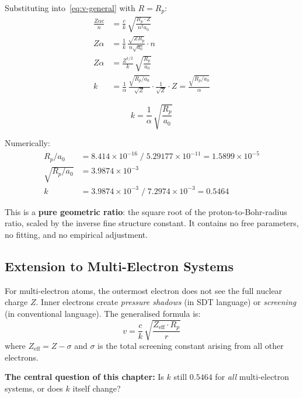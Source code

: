 Substituting into~\eqref{eq:v-general} with $R = R_p$:
\begin{align}
  \frac{Z\alpha c}{n} &= \frac{c}{k}\,\sqrt{\frac{R_p \cdot Z}{n^2 a_0}} \\[6pt]
  Z\alpha &= \frac{1}{k}\,\frac{\sqrt{Z R_p}}{n \sqrt{a_0}} \cdot n \\[6pt]
  Z\alpha &= \frac{Z^{1/2}}{k}\,\sqrt{\frac{R_p}{a_0}} \\[6pt]
  k &= \frac{1}{\alpha}\,\frac{\sqrt{R_p/a_0}}{\sqrt{Z}} \cdot \frac{1}{\sqrt{Z}} \cdot Z = \frac{\sqrt{R_p/a_0}}{\alpha}
\end{align}

\begin{equation}\label{eq:k-derived}
  \boxed{k = \frac{1}{\alpha}\,\sqrt{\frac{R_p}{a_0}}}
\end{equation}

Numerically:
\begin{align}
  R_p / a_0 &= 8.414 \times 10^{-16} \;/\; 5.29177 \times 10^{-11} = 1.5899 \times 10^{-5} \\
  \sqrt{R_p / a_0} &= 3.9874 \times 10^{-3} \\
  k &= 3.9874 \times 10^{-3}\;/\;7.2974 \times 10^{-3} = \mathbf{0.5464}
\end{align}

This is a \textbf{pure geometric ratio}: the square root of the proton-to-Bohr-radius ratio, scaled by the inverse fine structure constant.  It contains no free parameters, no fitting, and no empirical adjustment.

\subsection{Extension to Multi-Electron Systems}

For multi-electron atoms, the outermost electron does not see the full nuclear charge $Z$.  Inner electrons create \emph{pressure shadows} (in SDT language) or \emph{screening} (in conventional language).  The generalised formula is:
\begin{equation}\label{eq:v-general-N}
  v = \frac{c}{k}\,\sqrt{\frac{Z_{\text{eff}} \cdot R_p}{r}}
\end{equation}
where $Z_{\text{eff}} = Z - \sigma$ and $\sigma$ is the total screening constant arising from all other electrons.

\textbf{The central question of this chapter:} Is $k$ still $0.5464$ for \emph{all} multi-electron systems, or does $k$ itself change?


